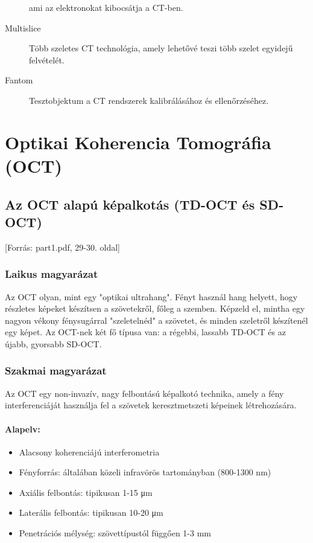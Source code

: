 \documentclass[a4paper,12pt]{article}
\begin{document}
\begin{description}
ami az elektronokat kibocsátja a CT-ben. \item[Multislice] Több szeletes CT technológia, amely lehetővé teszi több szelet egyidejű felvételét. \item[Fantom] Tesztobjektum a CT rendszerek kalibrálásához és ellenőrzéséhez.
\end{description}

\newpage

\section{Optikai Koherencia Tomográfia (OCT)}

\subsection{Az OCT alapú képalkotás (TD-OCT és SD-OCT)} [Forrás: part1.pdf, 29-30. oldal]

\subsubsection{Laikus magyarázat} Az OCT olyan, mint egy "optikai ultrahang". Fényt használ hang helyett, hogy részletes képeket készítsen a szövetekről, főleg a szemben. Képzeld el, mintha egy nagyon vékony fénysugárral "szeletelnéd" a szövetet, és minden szeletről készítenél egy képet. Az OCT-nek két fő típusa van: a régebbi, lassabb TD-OCT és az újabb, gyorsabb SD-OCT.

\subsubsection{Szakmai magyarázat} Az OCT egy non-invazív, nagy felbontású képalkotó technika, amely a fény interferenciáját használja fel a szövetek keresztmetszeti képeinek létrehozására.

\paragraph{Alapelv:} \begin{itemize} \item Alacsony koherenciájú interferometria \item Fényforrás: általában közeli infravörös tartományban (800-1300 nm) \item Axiális felbontás: tipikusan 1-15 μm \item Laterális felbontás: tipikusan 10-20 μm \item Penetrációs mélység: szövettípustól függően 1-3 mm \end{itemize}
\end{document}
